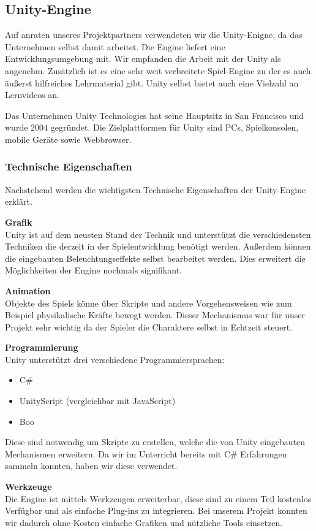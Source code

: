 \subsection{Unity-Engine}
Auf anraten unseres Projektpartners verwendeten wir die Unity-Enigne, da das Unternehmen selbst damit arbeitet. Die Engine liefert eine Entwicklungsumgebung mit. Wir empfanden die Arbeit mit der Unity als angenehm. Zusätzlich ist es eine sehr weit verbreitete Spiel-Engine zu der es auch äußerst hilfreiches Lehrmaterial gibt. Unity selbst bietet auch eine Vielzahl an Lernvideos an.

Das Unternehmen Unity Technologies hat seine Hauptsitz in San Francisco und wurde 2004 gegründet. Die Zielplattformen für Unity sind PCs, Spielkonsolen, mobile Geräte sowie Webbrowser. \cite{Unity-Engine}

\subsubsection{Technische Eigenschaften}
Nachstehend werden die wichtigsten Technische Eigenschaften der Unity-Engine erklärt. 

\textbf{Grafik}\\
Unity ist auf dem neusten Stand der Technik und unterstützt die verschiedensten Techniken die derzeit in der Spielentwicklung benötigt werden. Außerdem können die eingebauten Beleuchtungseffekte selbst bearbeitet werden. Dies erweitert die Möglichkeiten der Engine nochmals signifikant.

\textbf{Animation}\\
Objekte des Spiels könne über Skripte und andere Vorgehensweisen wie zum Beispiel physikalische Kräfte bewegt werden. Dieser Mechanismus war für unser Projekt sehr wichtig da der Spieler die Charaktere selbst in Echtzeit steuert. 

\textbf{Programmierung}\\
Unity unterstützt drei verschiedene Programmiersprachen:
\begin{itemize}
	\item C\#
	\item UnityScript (vergleichbar mit JavaScript)
	\item Boo
\end{itemize}
Diese sind notwendig um Skripte zu erstellen, welche die von Unity eingebauten Mechanismen erweitern. Da wir im Unterricht bereits mit C\# Erfahrungen sammeln konnten, haben wir diese verwendet.

\textbf{Werkzeuge}\\
Die Engine ist mittels Werkzeugen erweiterbar, diese sind zu einem Teil kostenlos Verfügbar und als einfache Plug-ins zu integrieren. Bei unserem Projekt konnten wir dadurch ohne Kosten einfache Grafiken und nützliche Tools einsetzen.\\
\cite{Unity-Engine}

